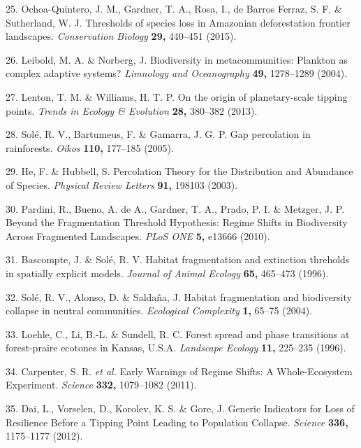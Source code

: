 \documentclass[]{article}
\begin{document}
\hypertarget{ref-Ochoa-Quintero2015}{}
25. Ochoa-Quintero, J. M., Gardner, T. A., Rosa, I., de Barros Ferraz,
S. F. \& Sutherland, W. J. Thresholds of species loss in Amazonian
deforestation frontier landscapes. \emph{Conservation Biology}
\textbf{29,} 440--451 (2015).

\hypertarget{ref-Leibold2004a}{}
26. Leibold, M. A. \& Norberg, J. Biodiversity in metacommunities:
Plankton as complex adaptive systems? \emph{Limnology and Oceanography}
\textbf{49,} 1278--1289 (2004).

\hypertarget{ref-Lenton2013}{}
27. Lenton, T. M. \& Williams, H. T. P. On the origin of planetary-scale
tipping points. \emph{Trends in Ecology \& Evolution} \textbf{28,}
380--382 (2013).

\hypertarget{ref-Sole2005}{}
28. Solé, R. V., Bartumeus, F. \& Gamarra, J. G. P. Gap percolation in
rainforests. \emph{Oikos} \textbf{110,} 177--185 (2005).

\hypertarget{ref-He2003}{}
29. He, F. \& Hubbell, S. Percolation Theory for the Distribution and
Abundance of Species. \emph{Physical Review Letters} \textbf{91,} 198103
(2003).

\hypertarget{ref-Pardini2010}{}
30. Pardini, R., Bueno, A. de A., Gardner, T. A., Prado, P. I. \&
Metzger, J. P. Beyond the Fragmentation Threshold Hypothesis: Regime
Shifts in Biodiversity Across Fragmented Landscapes. \emph{PLoS ONE}
\textbf{5,} e13666 (2010).

\hypertarget{ref-Bascompte1996}{}
31. Bascompte, J. \& Solé, R. V. Habitat fragmentation and extinction
threholds in spatially explicit models. \emph{Journal of Animal Ecology}
\textbf{65,} 465--473 (1996).

\hypertarget{ref-Sole2004}{}
32. Solé, R. V., Alonso, D. \& Saldaña, J. Habitat fragmentation and
biodiversity collapse in neutral communities. \emph{Ecological
Complexity} \textbf{1,} 65--75 (2004).

\hypertarget{ref-Loehle1996b}{}
33. Loehle, C., Li, B.-L. \& Sundell, R. C. Forest spread and phase
transitions at forest-praire ecotones in Kansas, U.S.A. \emph{Landscape
Ecology} \textbf{11,} 225--235 (1996).

\hypertarget{ref-Carpenter2011}{}
34. Carpenter, S. R. \emph{et al.} Early Warnings of Regime Shifts: A
Whole-Ecosystem Experiment. \emph{Science} \textbf{332,} 1079--1082
(2011).

\hypertarget{ref-Dai2012}{}
35. Dai, L., Vorselen, D., Korolev, K. S. \& Gore, J. Generic Indicators
for Loss of Resilience Before a Tipping Point Leading to Population
Collapse. \emph{Science} \textbf{336,} 1175--1177 (2012).
\end{document}
